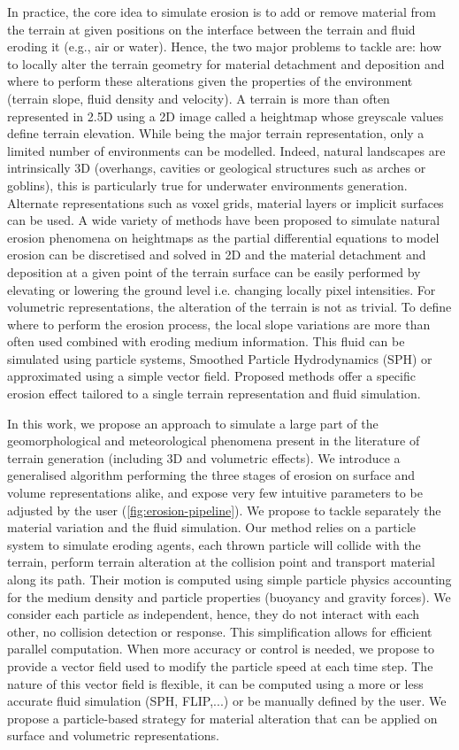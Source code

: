 In practice, the core idea to simulate erosion is to add or remove material from the terrain at given positions on the interface between the terrain and fluid eroding it (e.g., air or water). Hence, the two major problems to tackle are: how to locally alter the terrain geometry for material detachment and deposition and where to perform these alterations given the properties of the environment (terrain slope, fluid density and velocity).
A terrain is more than often represented in 2.5D using a 2D image called a heightmap whose greyscale values define terrain elevation. While being the major terrain representation, only a limited number of environments can be modelled. Indeed, natural landscapes are intrinsically 3D (overhangs, cavities or geological structures such as arches or goblins), this is particularly true for underwater environments generation. Alternate representations such as voxel grids, material layers or implicit surfaces can be used. A wide variety of methods have been proposed to simulate natural erosion phenomena on heightmaps as the partial differential equations to model erosion can be discretised and solved in 2D and the material detachment and deposition at a given point of the terrain surface can be easily performed by elevating or lowering the ground level i.e. changing locally pixel intensities.
For volumetric representations, the alteration of the terrain is not as trivial.
To define where to perform the erosion process, the local slope variations are more than often used combined with eroding medium information. This fluid can be simulated using particle systems, Smoothed Particle Hydrodynamics (SPH) \cite{Kristof2009} or approximated using a simple vector field.
Proposed methods offer a specific erosion effect tailored to a single terrain representation and fluid simulation.

In this work, we propose an approach to simulate a large part of the geomorphological and meteorological phenomena present in the literature of terrain generation (including 3D and volumetric effects). We introduce a generalised algorithm performing the three stages of erosion on surface and volume representations alike, and expose very few intuitive parameters to be adjusted by the user (\cref{fig:erosion-pipeline}).
We propose to tackle separately the material variation and the fluid simulation. Our method relies on a particle system to simulate eroding agents, each thrown particle will collide with the terrain, perform terrain alteration at the collision point and transport material along its path.
Their motion is computed using simple particle physics accounting for the medium density and particle properties (buoyancy and gravity forces). We consider each particle as independent, hence, they do not interact with each other, no collision detection or response. This simplification allows for efficient parallel computation.
When more accuracy or control is needed, we propose to provide a vector field used to modify the particle speed at each time step. The nature of this vector field is flexible, it can be computed using a more or less accurate fluid simulation (SPH, FLIP,...) or be manually defined by the user. We propose a particle-based strategy for material alteration that can be applied on surface and volumetric representations.

